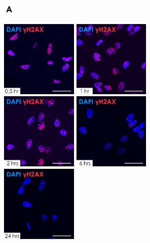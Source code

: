 \documentclass[onecolumn,10pt]{asme2ej}
\begin{document}
\begin{figure}[h]
	\includegraphics[width=0.05\textwidth]{figures/a}
	
	
	
	\includegraphics[width=0.33\textwidth]{figures/g-h2ax/30min}
	\includegraphics[width=0.33\textwidth]{figures/g-h2ax/1hr}
	\includegraphics[width=0.33\textwidth]{figures/g-h2ax/2hr.jpg}
	\includegraphics[width=0.33\textwidth]{figures/g-h2ax/6hr}
	\includegraphics[width=0.33\textwidth]{figures/g-h2ax/24hr}

\end{figure}
\end{document}
